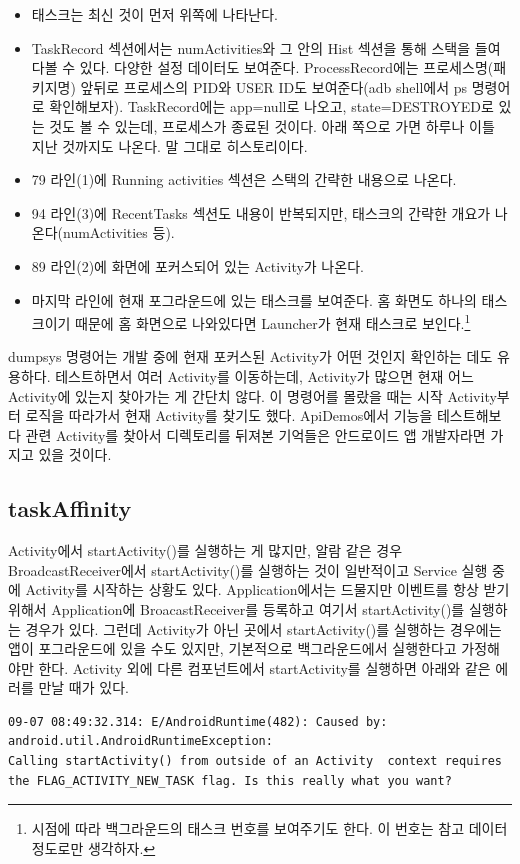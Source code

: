 \begin{itemize}
\item 태스크는 최신 것이 먼저 위쪽에 나타난다.
\item TaskRecord 섹션에서는 numActivities와 그 안의 Hist 섹션을 통해 스택을 들여다볼 수 있다. 다양한 설정 데이터도 보여준다. ProcessRecord에는 프로세스명(패키지명) 앞뒤로 프로세스의 PID와 USER ID도 보여준다(adb shell에서 ps 명령어로 확인해보자).
TaskRecord에는 app=null로 나오고, state=DESTROYED로 있는 것도 볼 수 있는데, 프로세스가 종료된 것이다. 아래 쪽으로 가면 하루나 이틀 지난 것까지도 나온다. 말 그대로 히스토리이다. 
\item 79 라인(1)에 Running activities 섹션은 스택의 간략한 내용으로 나온다.
\item 94 라인(3)에 RecentTasks 섹션도 내용이 반복되지만, 태스크의 간략한 개요가 나온다(numActivities 등).
\item 89 라인(2)에 화면에 포커스되어 있는 Activity가 나온다.
\item 마지막 라인에 현재 포그라운드에 있는 태스크를 보여준다. 홈 화면도 하나의 태스크이기 때문에 홈 화면으로 나와있다면 Launcher가 현재 태스크로 보인다.\footnote{시점에 따라 백그라운드의 태스크 번호를 보여주기도 한다. 이 번호는 참고 데이터 정도로만 생각하자.}
\end{itemize}
dumpsys 명령어는 개발 중에 현재 포커스된 Activity가 어떤 것인지 확인하는 데도 유용하다.
테스트하면서 여러 Activity를 이동하는데, Activity가 많으면 현재 어느 Activity에 있는지 찾아가는 게 간단치 않다.
이 명령어를 몰랐을 때는 시작 Activity부터 로직을 따라가서 현재 Activity를 찾기도 했다. ApiDemos에서 기능을 테스트해보다 관련 Activity를 찾아서 디렉토리를 뒤져본 기억들은 안드로이드 앱 개발자라면 가지고 있을 것이다.

\subsection{taskAffinity}
Activity에서 startActivity()를 실행하는 게 많지만, 알람 같은 경우 BroadcastReceiver에서 startActivity()를 실행하는 것이 일반적이고 Service 실행 중에 Activity를 시작하는 상황도 있다. Application에서는 드물지만 이벤트를 항상 받기 위해서 Application에 BroacastReceiver를 등록하고 여기서 startActivity()를 실행하는 경우가 있다.
그런데 Activity가 아닌 곳에서 startActivity()를 실행하는 경우에는 앱이 포그라운드에 있을 수도 있지만, 기본적으로 백그라운드에서 실행한다고 가정해야만 한다. Activity 외에 다른 컴포넌트에서 startActivity를 실행하면 아래와 같은 에러를 만날 때가 있다.
\begin{lstlisting}[frame=single]
09-07 08:49:32.314: E/AndroidRuntime(482): Caused by: android.util.AndroidRuntimeException: 
Calling startActivity() from outside of an Activity  context requires 
the FLAG_ACTIVITY_NEW_TASK flag. Is this really what you want?
\end{lstlisting}

